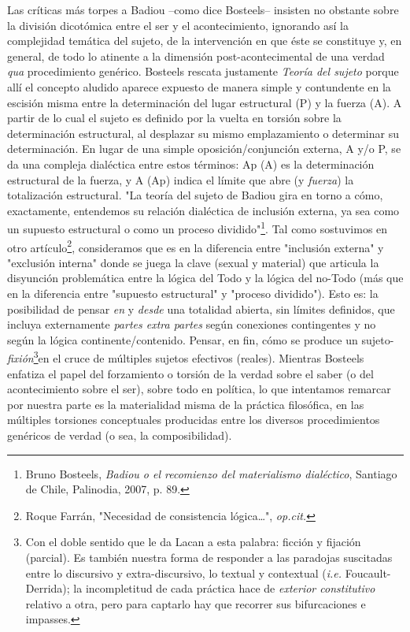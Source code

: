 \documentclass{book}
\begin{document}
Las críticas más torpes a Badiou --como dice Bosteels-- insisten no
obstante sobre la división dicotómica entre el ser y el acontecimiento,
ignorando así la complejidad temática del sujeto, de la intervención en
que éste se constituye y, en general, de todo lo atinente a la dimensión
post-acontecimental de una verdad \emph{qua} procedimiento genérico.
Bosteels rescata justamente \emph{Teoría del sujeto} porque allí el
concepto aludido aparece expuesto de manera simple y contundente en la
escisión misma entre la determinación del lugar estructural (P) y la
fuerza (A). A partir de lo cual el sujeto es definido por la vuelta en
torsión sobre la determinación estructural, al desplazar su mismo
emplazamiento o determinar su determinación. En lugar de una simple
oposición/conjunción externa, A y/o P, se da una compleja dialéctica
entre estos términos: Ap (A) es la determinación estructural de la
fuerza, y A (Ap) indica el límite que abre (y \emph{fuerza}) la
totalización estructural. "La teoría del sujeto de Badiou gira en torno
a cómo, exactamente, entendemos su relación dialéctica de inclusión
externa, ya sea como un supuesto estructural o como un proceso
dividido"\footnote{Bruno Bosteels, \emph{Badiou o el recomienzo del
  materialismo dialéctico}, Santiago de Chile, Palinodia, 2007, p. 89.}.
Tal como sostuvimos en otro artículo\footnote{Roque Farrán, "Necesidad
  de consistencia lógica\ldots", \emph{op.cit.}}, consideramos que es en
la diferencia entre "inclusión externa" y "exclusión interna" donde se
juega la clave (sexual y material) que articula la disyunción
problemática entre la lógica del Todo y la lógica del no-Todo (más que
en la diferencia entre "supuesto estructural" y "proceso dividido").
Esto es: la posibilidad de pensar \emph{en} y \emph{desde} una totalidad
abierta, sin límites definidos, que incluya externamente \emph{partes
extra partes} según conexiones contingentes y no según la lógica
continente/contenido. Pensar, en fin, cómo se produce un
sujeto-\emph{fixión}\footnote{Con el doble sentido que le da Lacan a
  esta palabra: ficción y fijación (parcial). Es también nuestra forma
  de responder a las paradojas suscitadas entre lo discursivo y
  extra-discursivo, lo textual y contextual (\emph{i.e.}
  Foucault-Derrida); la incompletitud de cada práctica hace de
  \emph{exterior constitutivo} relativo a otra, pero para captarlo hay
  que recorrer sus bifurcaciones e impasses.}en el cruce de múltiples
sujetos efectivos (reales). Mientras Bosteels enfatiza el papel del
forzamiento o torsión de la verdad sobre el saber (o del acontecimiento
sobre el ser), sobre todo en política, lo que intentamos remarcar por
nuestra parte es la materialidad misma de la práctica filosófica, en las
múltiples torsiones conceptuales producidas entre los diversos
procedimientos genéricos de verdad (o sea, la composibilidad).
\end{document}
